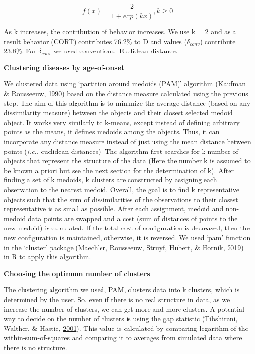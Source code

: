 \documentclass[12pt,twoside]{unicam}
\begin{document}
\begin{equation}
    f(x) = \dfrac{2}{1+exp(kx)}, k≥0
  \label{eq:disexpadaptivetuning}
\end{equation}

As k increases, the contribution of behavior increases. We use k = 2 and as a result behavior (CORT) contributes 76.2\% to D and values (\(\delta_{conv}\)) contribute 23.8\%. For \(\delta_{conv}\) we used conventional Euclidean distance.

\textbf{Clustering diseases by age-of-onset}

We clustered data using `partition around medoids (PAM)' algorithm (Kaufman \& Rousseeuw, \protect\hyperlink{ref-Kaufman1990}{1990}) based on the distance measure calculated using the previous step. The aim of this algorithm is to minimize the average distance (based on any dissimilarity measure) between the objects and their closest selected medoid object. It works very similarly to k-means, except instead of defining arbitrary points as the means, it defines medoids among the objects. Thus, it can incorporate any distance measure instead of just using the mean distance between points (\emph{i.e.}, euclidean distances). The algorithm first searches for k number of objects that represent the structure of the data (Here the number k is assumed to be known a priori but see the next section for the determination of k). After finding a set of k medoids, k clusters are constructed by assigning each observation to the nearest medoid. Overall, the goal is to find k representative objects such that the sum of dissimilarities of the observations to their closest representative is as small as possible. After each assignment, medoid and non-medoid data points are swapped and a cost (sum of distances of points to the new medoid) is calculated. If the total cost of configuration is decreased, then the new configuration is maintained, otherwise, it is reversed. We used `pam' function in the `cluster' package (Maechler, Rousseeuw, Struyf, Hubert, \& Hornik, \protect\hyperlink{ref-Maechler2019}{2019}) in R to apply this algorithm.

\textbf{Choosing the optimum number of clusters}

The clustering algorithm we used, PAM, clusters data into k clusters, which is determined by the user. So, even if there is no real structure in data, as we increase the number of clusters, we can get more and more clusters. A potential way to decide on the number of clusters is using the gap statistic (Tibshirani, Walther, \& Hastie, \protect\hyperlink{ref-Tibshirani2001}{2001}). This value is calculated by comparing logarithm of the within-sum-of-squares and comparing it to averages from simulated data where there is no structure.
\end{document}
